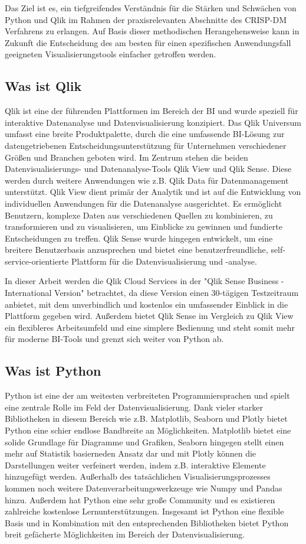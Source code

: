 \documentclass[12pt]{article}
\begin{document}
	Das Ziel ist es, ein tiefgreifendes Verständnis für die Stärken und Schwächen von Python und Qlik im Rahmen der praxisrelevanten Abschnitte des CRISP-DM Verfahrens zu erlangen. Auf Basis dieser methodischen Herangehensweise kann in Zukunft die Entscheidung des am besten für einen spezifischen Anwendungsfall geeigneten Visualisierungstools einfacher getroffen werden.
	
	\subsection{Was ist Qlik}
	Qlik ist eine der führenden Plattformen im Bereich der BI und wurde speziell für interaktive Datenanalyse und Datenvisualisierung konzipiert. Das Qlik Universum umfasst eine breite Produktpalette, durch die eine umfassende BI-Lösung zur datengetriebenen Entscheidungsunterstützung für Unternehmen verschiedener Größen und Branchen geboten wird. Im Zentrum stehen die beiden Datenvisualisierungs- und Datenanalyse-Tools Qlik View und Qlik Sense. Diese werden durch weitere Anwendungen wie z.B. Qlik Data für Datenmanagement unterstützt. Qlik View dient primär der Analytik und ist auf die Entwicklung von individuellen Anwendungen für die Datenanalyse ausgerichtet. Es ermöglicht Benutzern, komplexe Daten aus verschiedenen Quellen zu kombinieren, zu transformieren und zu visualisieren, um Einblicke zu gewinnen und fundierte Entscheidungen zu treffen. Qlik Sense wurde hingegen entwickelt, um eine breitere Benutzerbasis anzusprechen und bietet eine benutzerfreundliche, self-service-orientierte Plattform für die Datenvisualisierung und -analyse.
	
	In dieser Arbeit werden die Qlik Cloud Services in der "Qlik Sense Business - International Version"  betrachtet, da diese Version einen 30-tägigen Testzeitraum anbietet, mit dem unverbindlich und kostenlos ein umfassender Einblick in die Plattform gegeben wird. Außerdem bietet Qlik Sense im Vergleich zu Qlik View ein flexibleres Arbeitsumfeld und eine simplere Bedienung und steht somit mehr für moderne BI-Tools und grenzt sich weiter von Python ab.
	
	\subsection{Was ist Python}
	Python ist eine der am weitesten verbreiteten Programmiersprachen und spielt eine zentrale Rolle im Feld der Datenvisualisierung. Dank vieler starker Bibliotheken in diesem Bereich wie z.B. Matplotlib, Seaborn und Plotly bietet Python eine schier endlose Bandbreite an Möglichkeiten. Matplotlib bietet eine solide Grundlage für Diagramme und Grafiken, Seaborn hingegen stellt einen mehr auf Statistik basierneden Ansatz dar und mit Plotly können die Darstellungen weiter verfeinert werden, indem z.B. interaktive Elemente hinzugefügt werden. Außerhalb des tatsächlichen Visualisierungsprozesses kommen noch weitere Datenverarbeitungswerkzeuge wie Numpy und Pandas hinzu. Außerdem hat Python eine sehr große Community und es existieren zahlreiche kostenlose Lernunterstützungen.
	Insgesamt ist Python eine flexible Basis und in Kombination mit den entsprechenden Bibliotheken bietet Python breit gefächerte Möglichkeiten im Bereich der Datenvisualisierung.
	
\end{document}
